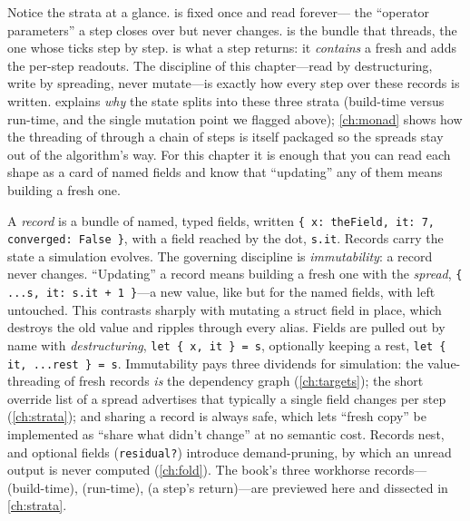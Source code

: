 Notice the strata at a glance.  is fixed once and read forever---
the ``operator parameters'' a step closes over but never changes. 
is the bundle that threads, the one whose  ticks step by step.
 is what a step returns: it \emph{contains} a fresh
 and adds the per-step readouts. The discipline of this
chapter---read by destructuring, write by spreading, never mutate---is exactly how
every step over these records is written.  explains \emph{why} the
state splits into these three strata (build-time versus run-time, and the single
mutation point we flagged above); \cref{ch:monad} shows how the threading of
 through a chain of steps is itself packaged so the spreads stay
out of the algorithm's way. For this chapter it is enough that you can read each
shape as a card of named fields and know that ``updating'' any of them means
building a fresh one.

\summarysection
A \emph{record} is a bundle of named, typed fields,
written \lstinline[style=l4style]|{ x: theField, it: 7, converged: False }|, with
a field reached by the dot, \lstinline[style=l4style]|s.it|. Records carry the
state a simulation evolves. The governing discipline is \emph{immutability}: a
record never changes. ``Updating'' a record means building a fresh one with the
\emph{spread}, \lstinline[style=l4style]|{ ...s, it: s.it + 1 }|---a new value,
like  but for the named fields, with  left untouched. This
contrasts sharply with mutating a struct field in place, which destroys the old
value and ripples through every alias. Fields are pulled out by name with
\emph{destructuring}, \lstinline[style=l4style]|let { x, it } = s|, optionally
keeping a rest, \lstinline[style=l4style]|let { it, ...rest } = s|. Immutability
pays three dividends for simulation: the value-threading of fresh records
\emph{is} the dependency graph (\cref{ch:targets}); the short override list of a
spread advertises that typically a single field changes per step
(\cref{ch:strata}); and sharing a record is always safe, which lets ``fresh
copy'' be implemented as ``share what didn't change'' at no semantic cost. Records
nest, and optional fields (\lstinline[style=l4style]|residual?|) introduce
demand-pruning, by which an unread output is never computed (\cref{ch:fold}). The
book's three workhorse records--- (build-time),
 (run-time),  (a step's return)---are previewed
here and dissected in \cref{ch:strata}.

